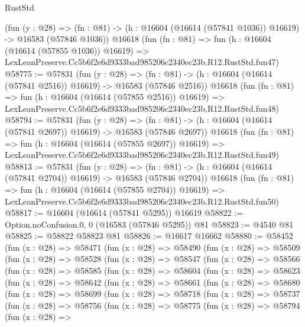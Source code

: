 \begin{lexlean}{RustStd}
\begin{coremodule}
    (fun (y : @28) =>
    (fn : @81) -> (h : @16604 (@16614 (@57841 @1036)) @16619) -> @16583 (@57846 @1036))
    @16618
    (fun (fn : @81) =>
    fun (h : @16604 (@16614 (@57855 @1036)) @16619) =>
    LexLeanPreserve.Cc5b6f2e6d9333bad985206c2340ec23b.R12.RustStd.fun47)
@58775 := @57831
    (fun (y : @28) =>
    (fn : @81) -> (h : @16604 (@16614 (@57841 @2516)) @16619) -> @16583 (@57846 @2516))
    @16618
    (fun (fn : @81) =>
    fun (h : @16604 (@16614 (@57855 @2516)) @16619) =>
    LexLeanPreserve.Cc5b6f2e6d9333bad985206c2340ec23b.R12.RustStd.fun48)
@58794 := @57831
    (fun (y : @28) =>
    (fn : @81) -> (h : @16604 (@16614 (@57841 @2697)) @16619) -> @16583 (@57846 @2697))
    @16618
    (fun (fn : @81) =>
    fun (h : @16604 (@16614 (@57855 @2697)) @16619) =>
    LexLeanPreserve.Cc5b6f2e6d9333bad985206c2340ec23b.R12.RustStd.fun49)
@58813 := @57831
    (fun (y : @28) =>
    (fn : @81) -> (h : @16604 (@16614 (@57841 @2704)) @16619) -> @16583 (@57846 @2704))
    @16618
    (fun (fn : @81) =>
    fun (h : @16604 (@16614 (@57855 @2704)) @16619) =>
    LexLeanPreserve.Cc5b6f2e6d9333bad985206c2340ec23b.R12.RustStd.fun50)
@58817 := @16604 (@16614 (@57841 @5295)) @16619
@58822 := Option.noConfusion.{0, 0} (@16583 (@57846 @5295)) @81
@58823 := @4540 @81
@58825 := @58822 @58823 @81
@58826 := @16617 @16662
@58880 := @58452
    (fun (x : @28) =>
    @58471
      (fun (x : @28) =>
      @58490
        (fun (x : @28) =>
        @58509
          (fun (x : @28) =>
          @58528
            (fun (x : @28) =>
            @58547
              (fun (x : @28) =>
              @58566
                (fun (x : @28) =>
                @58585
                  (fun (x : @28) =>
                  @58604
                    (fun (x : @28) =>
                    @58623
                      (fun (x : @28) =>
                      @58642
                        (fun (x : @28) =>
                        @58661
                          (fun (x : @28) =>
                          @58680
                            (fun (x : @28) =>
                            @58699
                              (fun (x : @28) =>
                              @58718
                                (fun (x : @28) =>
                                @58737
                                  (fun (x : @28) =>
                                  @58756
                                    (fun (x : @28) =>
                                    @58775
                                      (fun (x : @28) =>
                                      @58794
                                        (fun (x : @28) =>

\end{coremodule}
\end{lexlean}
